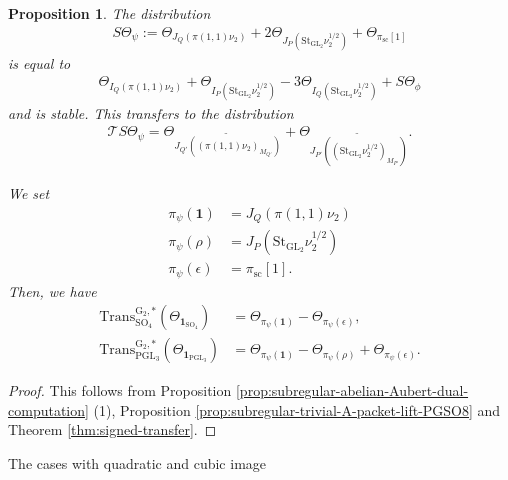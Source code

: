 \documentclass[12pt]{amsart}
\makeatletter
\renewcommand{\subsection}{\@startsection{subsection}{2}%
  \z@{.7\linespacing\@plus.5\linespacing}{.35\linespacing}%
  {\normalfont\bfseries\raggedright}}
\theoremstyle{definition}
\theoremstyle{plain}
\newtheorem{proposition}[definition]{Proposition}
\theoremstyle{remark}
\def\GL{\mathrm{GL}}
\def\PGL{\mathrm{PGL}}
\def\SO{\mathrm{SO}}
\newcommand{\cT}{\mathcal{T}}
\numberwithin{equation}{section}
\newcommand{\rG}{\mathrm{G}}
\newcommand{\Trans}{\mathrm{Trans}}
\newcommand{\St}{\mathrm{St}}
\makeatother
\begin{document}
\begin{proposition}\label{prop:subregular-trivial-ecr}
      The distribution
      \begin{align*}
            S\Theta_{\psi} := \Theta_{J_Q(\pi(1, 1) \nu_2)} + 2\Theta_{J_P(\St_{\GL_2}\nu_2^{1/2})} + \Theta_{\pi_{\mathrm{sc}}[1]}
      \end{align*}
      is equal to 
      \begin{align*}
            \Theta_{I_Q(\pi(1, 1) \nu_2)} + \Theta_{I_P(\St_{\GL_2}\nu_2^{1/2})} -3 \Theta_{I_Q(\St_{\GL_2}\nu_2^{1/2})} + S\Theta_{\phi}
      \end{align*}
      and is stable. This transfers to the distribution
      \begin{align*}
            \cT S\Theta_{\psi} =
            \Theta_{\widetilde{J_{Q'}((\pi(1, 1)\nu_2)_{M_{Q'}})}} 
            +
            \Theta_{\widetilde{J_{P'} ((\St_{\GL_2}\nu_2^{1/2})_{M_{P'}})}}.
      \end{align*}

      We set 
      \begin{align*}
            \pi_{\psi}(\mathbf{1}) &= J_Q(\pi(1, 1) \nu_2) \\
            \pi_{\psi}(\rho) &= J_P(\St_{\GL_2}\nu_2^{1/2}) \\
            \pi_{\psi}(\epsilon) &= \pi_{\mathrm{sc}}[1].
      \end{align*}
      Then, we have 
      \begin{align*}
            \Trans^{\rG_2, *}_{\SO_4}(\Theta_{\mathbf{1}_{\SO_4}}) &= \Theta_{\pi_{\psi}(\mathbf{1})} - \Theta_{\pi_{\psi}(\epsilon)}, \\
            \Trans^{\rG_2, *}_{\PGL_3}(\Theta_{\mathbf{1}_{\PGL_3}}) &= \Theta_{\pi_{\psi}(\mathbf{1})} - \Theta_{\pi_{\psi}(\rho)} + \Theta_{\pi_{\psi}(\epsilon)}.
      \end{align*}
\end{proposition}

\begin{proof}
      This follows from Proposition \ref{prop:subregular-abelian-Aubert-dual-computation} (1), Proposition \ref{prop:subregular-trivial-A-packet-lift-PGSO8} and Theorem \ref{thm:signed-transfer}.
\end{proof}

\subsection{The cases with quadratic and cubic image}\label{sec:subregular-quadratic}
\end{document}
